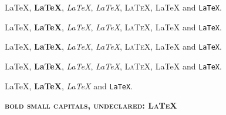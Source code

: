 \documentclass[11pt]{article}
\begin{document}
{\small \LaTeX, \textbf{\LaTeX}, \textit{\LaTeX}, \textsl{\LaTeX}, \textsc{\LaTeX}, \textsf{\LaTeX} and \texttt{\LaTeX}.\par}
{\footnotesize \LaTeX, \textbf{\LaTeX}, \textit{\LaTeX}, \textsl{\LaTeX}, \textsc{\LaTeX}, \textsf{\LaTeX} and \texttt{\LaTeX}.\par}
{\scriptsize \LaTeX, \textbf{\LaTeX}, \textit{\LaTeX}, \textsl{\LaTeX}, \textsc{\LaTeX}, \textsf{\LaTeX} and \texttt{\LaTeX}.\par}
{\normalsize \LaTeX, \textbf{\LaTeX}, \textit{\LaTeX}, \textsl{\LaTeX}, \textsc{\LaTeX}, \textsf{\LaTeX} and \texttt{\LaTeX}.\par}
{\tiny \LaTeX, \textbf{\LaTeX}, \textit{\LaTeX} and \texttt{\LaTeX}.\par}
{\small\bfseries\scshape bold small capitals, undeclared: \LaTeX\par}
\end{document}
